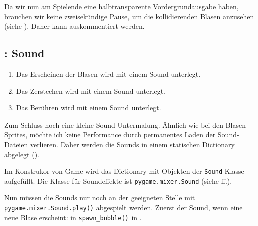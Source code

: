 
Da wir nun am Spielende eine halbtransparente Vordergrundausgabe haben, brauchen wir keine zweisekündige Pause, um die kollidierenden Blasen anzusehen (siehe ). Daher kann  auskommentiert werden.


\subsection{: Sound}
\begin{enumerate}
 \item Das Erscheinen der Blasen wird mit einem Sound unterlegt.\label{reqSoundErscheinen}
 \item Das Zerstechen wird mit einem Sound unterlegt.\label{reqSoundZerstechen}
 \item Das Berühren wird mit einem Sound unterlegt.\label{reqSoundBerühren}
\end{enumerate}
\er

Zum Schluss noch eine kleine Sound-Untermalung. Ähnlich wie bei den Blasen-Sprites, möchte ich keine Performance durch permanentes Laden der Sound-Dateien verlieren. Daher werden die Sounds in einem statischen Dictionary abgelegt (). 



Im Konstrukor von Game wird das Dictionary mit Objekten der \texttt{Sound}-Klasse aufgefüllt. Die Klasse für Soundeffekte ist \texttt{pygame.mixer.Sound} (siehe ff.).

\newpage
{}  

Nun müssen die Sounds nur noch an der geeigneten Stelle mit \texttt{pygame.mixer.Sound.\-play()} abgespielt werden. Zuerst der Sound, wenn eine neue Blase erscheint: in \texttt{spawn\_\-bubb\-le()} in .

